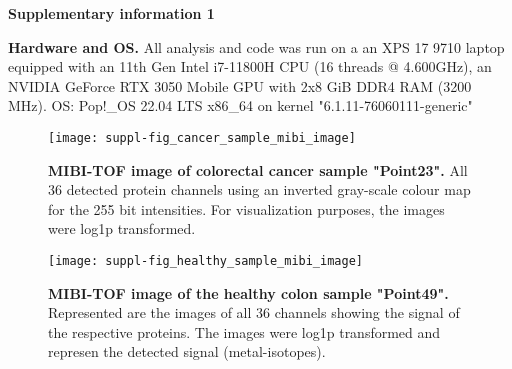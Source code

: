 \clearpage

\scriptsize \textbf{Supplementary information 1}

\textbf{Hardware and OS.} All analysis and code was run on a an XPS 17 9710 laptop equipped with an 11th Gen Intel i7-11800H CPU (16 threads @ 4.600GHz), an NVIDIA GeForce RTX 3050 Mobile GPU with 2x8 GiB DDR4 RAM (3200 MHz). OS: Pop!\_OS 22.04 LTS x86\_64 on kernel "6.1.11-76060111-generic"
\pagebreak

\begin{figure}[h!]
    \centering
    \texttt{[image: suppl-fig\_cancer\_sample\_mibi\_image]}
    \caption{\textbf{MIBI-TOF image of colorectal cancer sample "Point23".} All 36 detected protein channels using an inverted gray-scale colour map for the 255 bit intensities. For visualization purposes, the images were log1p transformed.}
    \label{fig:sup1}
\end{figure}

\pagebreak


\begin{figure}[p]
    \centering
    \texttt{[image: suppl-fig\_healthy\_sample\_mibi\_image]}
    \caption{\textbf{MIBI-TOF image of the healthy colon sample "Point49".} Represented are the images of all 36 channels showing the signal of the respective proteins. The images were log1p transformed and represen the detected signal (metal-isotopes).}
    \label{fig:sup2}
\end{figure}

\pagebreak
